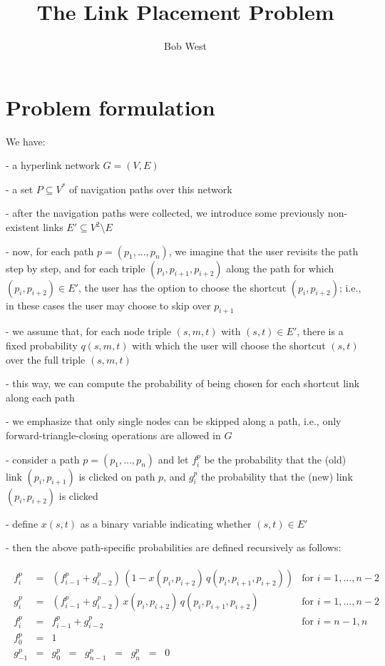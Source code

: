 \documentclass[11pt,letterpaper]{article}
\begin{document}
\title{The Link Placement Problem}
\author{Bob West}
\maketitle

\section{Problem formulation}

We have:

- a hyperlink network $G=(V,E)$

- a set $P \subseteq V^*$ of navigation paths over this network

- after the navigation paths were collected, we introduce some previously non-existent links $E' \subseteq V^2 \setminus E$

- now, for each path $p=(p_1,\dots,p_n)$, we imagine that the user revisits the path step by step, and for each triple $(p_i,p_{i+1},p_{i+2})$ along the path for which $(p_i,p_{i+2}) \in E'$, the user has the option to choose the shortcut $(p_i,p_{i+2})$; i.e., in these cases the user may choose to skip over $p_{i+1}$

- we assume that, for each node triple $(s,m,t)$ with $(s,t) \in E'$, there is a fixed probability $q(s,m,t)$ with which the user will choose the shortcut $(s,t)$ over the full triple $(s,m,t)$

- this way, we can compute the probability of being chosen for each shortcut link along each path

- we emphasize that only single nodes can be skipped along a path, i.e., only forward\hyp  triangle\hyp closing operations are allowed in $G$

- consider a path $p=(p_1,\dots,p_n)$ and let $f^p_i$ be the probability that the (old) link $(p_i,p_{i+1})$ is clicked on path $p$, and $g^p_i$ the probability that the (new) link $(p_i,p_{i+2})$ is clicked

- define $x(s,t)$ as a binary variable indicating whether $(s,t) \in E'$

- then the above path\hyp specific probabilities are defined recursively as follows:

\begin{eqnarray}
\begin{array}{llll}
f^p_i &=& \left(f^p_{i-1} + g^p_{i-2}\right) \, (1 - x(p_i,p_{i+2}) \, q(p_i,p_{i+1},p_{i+2})) & \mbox{for $i=1,\dots,n-2$} \\
g^p_i &=& \left(f^p_{i-1} + g^p_{i-2}\right) \, x(p_i,p_{i+2}) \, q(p_i,p_{i+1},p_{i+2}) & \mbox{for $i=1,\dots,n-2$} \\
f^p_{i} &=& f^p_{i-1} + g^p_{i-2} & \mbox{for $i=n-1,n$} \\
f^p_0 &=& 1 & \\
g^p_{-1} &=& g^p_0 \;\;=\;\; g^p_{n-1} \;\;=\;\; g^p_n \;\;=\;\; 0 &
\end{array}
\label{eqn:f_and_g}
\end{eqnarray}
\end{document}
